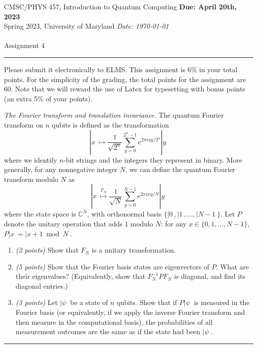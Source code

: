 \documentclass{article}
\newcommand{\shortbar}{\begin{center}\rule{5ex}{0.1pt}\end{center}}
\newcommand{\courseNumber}{CMSC/PHYS 457}
\newcommand{\courseTitle}{Introduction to Quantum Computing}
\newcommand{\semester}{Spring 2023}
\theoremstyle{plain}
\theoremstyle{definition}
\theoremstyle{remark}
\newenvironment{problem}[1]{\medskip\noindent{\bf Problem #1.~}}{\shortbar}
\newenvironment{solution}[1]{\medskip\noindent{\bf Solution #1.~}}{\shortbar}
\newcommand{\C}{\mathbb{C}}
\newcommand{\solutions}[3]{
\vspace{-2ex}
\begin{center}
{\small  \courseNumber, \courseTitle
\hfill {\large \bf {Due: #1} }\\
\semester, University of Maryland \hfill
{\em Date: #3}}\\
\vspace{-1ex}
\hrulefill\\
\vspace{4ex}
{\Large #2}\\
\vspace{2ex}
\end{center}
\shortbar
\vspace{3ex}
}
\newcommand{\points}[1]{\textit{(#1 points)}}
\begin{document}
\solutions{April 20th, 2023}{Assignment 4}{\today}
%
%

Please submit it electronically to ELMS. This assignment is 6\% in your total points. For the simplicity
of the grading, the total points for the assignment are 60. Note that we will reward the use of Latex for
typesetting with bonus points (an extra 5\% of your points).

\begin{problem}{1}
\emph{The Fourier transform and translation invariance.}
The quantum Fourier transform on $n$ qubits is defined as the transformation
\[
  |x\> \mapsto \frac{1}{\sqrt{2^n}} \sum_{y=0}^{2^n-1} e^{2\pi i xy/2^n} |y\>
\]
where we identify $n$-bit strings and the integers they represent in binary.
More generally, for any nonnegative integer $N$, we can define the quantum Fourier transform modulo $N$ as
\[
  |x\> \stackrel{F_N}{\mapsto} \frac{1}{\sqrt{N}} \sum_{y=0}^{N-1} e^{2\pi i xy/N} |y\>
\]
where the state space is $\C^N$, with orthonormal basis $\{|0\>,|1\>,\ldots,|N-1\>\}$.
Let $P$ denote the unitary operation that adds $1$ modulo $N$: for any $x \in \{0,1,\ldots,N-1\}$, $P|x\>=|x+1 \bmod N\>$.
\begin{enumerate}
\item \points{2} Show that $F_N$ is a unitary transformation.
  \item \points{5} Show that the Fourier basis states are eigenvectors of $P$.  What are their eigenvalues?  (Equivalently, show that $F_N^{-1}PF_N$ is diagonal, and find its diagonal entries.)
  \item \points{3} Let $|\psi\>$ be a state of $n$ qubits.  Show that if $P|\psi\>$ is measured in the Fourier basis (or equivalently, if we apply the inverse Fourier transform and then measure in the computational basis), the probabilities of all measurement outcomes are the same as if the state had been $|\psi\>$.
\end{enumerate}
\end{problem}
\end{document}

